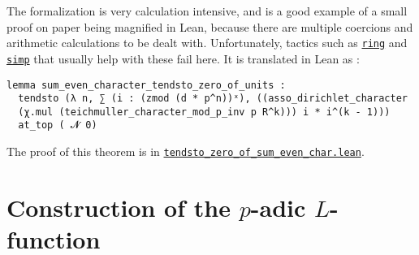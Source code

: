 \documentclass[a4paper,UKenglish,cleveref, autoref, thm-restate,pdfa]{lipics-v2021}
\newcommand{\lean}[1]{\texttt{#1}\xspace} %
\begin{document}
The formalization is very calculation intensive, and is a good example of a small proof on paper being magnified in Lean, 
because there are multiple coercions and arithmetic calculations to be dealt with. %
Unfortunately, tactics such as \href{https://leanprover-community.github.io/mathlib_docs/tactics.html#ring}{\lean{ring}} and 
\href{https://leanprover-community.github.io/mathlib_docs/tactics.html#simp}{\lean{simp}} that usually help with these fail here. 
It is translated in Lean as :
\begin{lstlisting}
lemma sum_even_character_tendsto_zero_of_units :
  tendsto (λ n, ∑ (i : (zmod (d * p^n))ˣ), ((asso_dirichlet_character
  (χ.mul (teichmuller_character_mod_p_inv p R^k))) i * i^(k - 1))) 
  at_top ( 𝓝 0) 
\end{lstlisting}
The proof of this theorem is in \href{https://github.com/laughinggas/p-adic-L-functions/blob/main/src/tendsto_zero_of_sum_even_char.lean}{\lean{tendsto\_zero\_of\_sum\_even\_char.lean}}.
\section{Construction of the $p$-adic $L$-function}
\label{section3}
\end{document}
